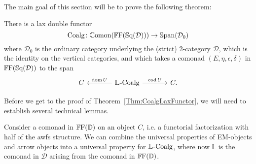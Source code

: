 The main goal of this section will be to prove the following theorem:

\begin{theorem}\label{Thm:CoalgLaxFunctor}
	There is a lax double functor
	\[
		\mathrm{Coalg}\colon \mathbb{C}\mathrm{omon}(\mathbb{F}\mathrm{F}(\mathbb{S}\mathrm{q}(\mathcal{D}))) \to \mathbb{S}\mathrm{pan}(\mathcal{D}_0)
	\] 
	where $\mathcal{D}_0$ is the ordinary category underlying the (strict) 2-category $\mathcal{D}$, which is the identity on the vertical categories, and which takes a comonad $(E,\eta,\epsilon,\delta)$ in $\mathbb{F}\mathrm{F}(\mathbb{S}\mathrm{q}(\mathcal{D}))$ to the span
	\[
	\begin{tikzcd}[column sep=large]
		C & \LCoalg \lar[swap]{\dom U} \rar{\cod U} & C.
	\end{tikzcd}
	\]
\end{theorem}

Before we get to the proof of Theorem~\ref{Thm:CoalgLaxFunctor}, we will need to establish several technical lemmas.

Consider a comonad in $\mathbb{F}\mathrm{F}(\mathbb{D})$ on an object $C$, i.e. a functorial factorization with half of the awfs structure. We can combine the universal properties of EM-objects and arrow objects into a universal property for $\mathbb{L}_{}\text{-}\mathrm{Coalg}$, where now $\mathbb{L}$ is the comonad in $\mathcal{D}$ arising from the comonad in $\mathbb{F}\mathrm{F}(\mathbb{D})$.

